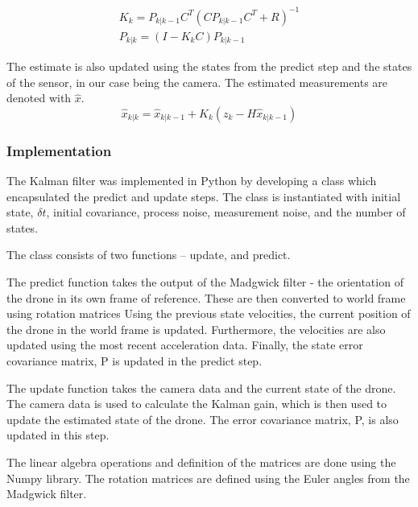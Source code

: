 \documentclass[bare_jrnl_transmag]{subfiles}
\begin{document}
\begin{eqnarray*}
    K_k = P_{k|k-1} C^T (C P_{k|k-1} C^T + R)^{-1} \\[1em]
    P_{k|k} = (I - K_k C) P_{k|k-1}
\end{eqnarray*}

The estimate is also updated using the states from the predict step and the states of the sensor, in our case being the camera. 
The estimated measurements are denoted with $\hat{x}$. 
\begin{equation*}
    \hat{x}_{k|k} = \hat{x}_{k|k-1} + K_k (z_k - H \hat{x}_{k|k-1})
\end{equation*}
\newline

\subsubsection{Implementation}

The Kalman filter was implemented in Python by developing a class which encapsulated the predict and update steps. The class is instantiated with initial state, $\delta t$, initial covariance, process noise, measurement noise, and the number of states. 

The class consists of two functions -- update, and predict.\newline

The predict function takes the output of the Madgwick filter - the orientation of the drone in its own frame of reference. These are then converted to world frame using rotation matrices Using the previous state velocities, the current position of the drone in the world frame is updated. Furthermore, the velocities are also updated using the most recent acceleration data. Finally, the state error covariance matrix, P is updated in the predict step. \newline

The update function takes the camera data and the current state of the drone. The camera data is used to calculate the Kalman gain, which is then used to update the estimated state of the drone. The error covariance matrix, P, is also updated in this step.\newline

The linear algebra operations and definition of the matrices are done using the Numpy library. The rotation matrices are defined using the Euler angles from the Madgwick filter. 
\end{document}
